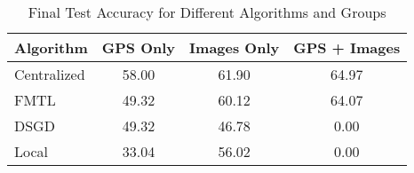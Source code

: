 
\begin{table}[ht]
    \centering
    \begin{tabular}{lccc}
        \hline
        \textbf{Algorithm} & \textbf{GPS Only} & \textbf{Images Only} & \textbf{GPS + Images} \\
        \hline
Centralized & 58.00 & 61.90 & 64.97 \\
FMTL & 49.32 & 60.12 & 64.07 \\
DSGD & 49.32 & 46.78 & 0.00 \\
Local & 33.04 & 56.02 & 0.00 \\
        \hline
    \end{tabular}
    \caption{Final Test Accuracy for Different Algorithms and Groups}
    \label{tab:accuracy_results}
\end{table}
